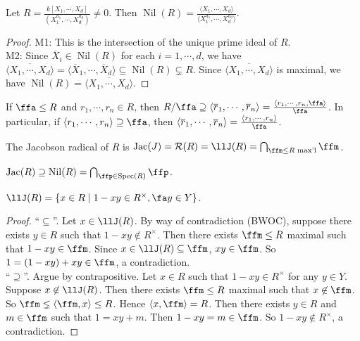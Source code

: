 \begin{example}
    Let $R = \frac{k[X_1,\cdots,X_d]}{(X_1^{a_1},\cdots,X_d^{a_d})} \neq 0$. Then $\operatorname{Nil}(R) = \frac{\langle X_1,\cdots,X_d \rangle}{\langle X_1^{a_1},\cdots,X_d^{a_d} \rangle}$.
\end{example}

\begin{proof}
    M1: This is the intersection of the unique prime ideal of $R$. \\
    M2: Since $\overline X_i \in \operatorname{Nil}(R)$ for each $i = 1,\cdots,d$, we have $\overline {\langle X_1,\cdots,X_d \rangle} = \langle \overline X_1,\cdots,\overline X_d \rangle \subseteq \operatorname{Nil}(R) \subsetneq R$. Since $\overline {\langle X_1,\cdots,X_d \rangle}$ is maximal, we have $\operatorname{Nil}(R) = \overline {\langle X_1,\cdots,X_d \rangle}$.
\end{proof}

\begin{remark}[Fact]
    If $\ffa \leq R$ and $r_1,\cdots,r_n \in R$, then $R/\ffa \supseteq \langle \overline r_1,\cdots,\overline r_n \rangle = \frac{\langle r_1,\cdots,r_n, \ffa \rangle}{\ffa}$. In particular, if $\langle r_1,\cdots,r_n \rangle \supseteq \ffa$, then $\langle \overline r_1, \cdots, \overline r_n \rangle = \frac{\langle r_1,\cdots,r_n \rangle}{\ffa}$.
\end{remark}

\begin{definition}
    The Jacobson radical of $R$ is $\operatorname{Jac}(J) = \mathcal R(R) = \llJ(R) = \bigcap_{\ffm \leq R \text{ max'l}}\ffm$.
\end{definition}

\begin{remark}
    $\operatorname{Jac}(R) \supseteq \operatorname{Nil}(R) = \bigcap_{\ffp \in \operatorname{Spec}(R)}\ffp$.
\end{remark}

\begin{proposition}
    $\llJ(R) = \{x \in R \mid 1-xy \in R^\times, \fa y \in Y\}$.
\end{proposition}

\begin{proof}
    ``$\subseteq$''. Let $x \in \llJ(R)$. By way of contradiction (BWOC), suppose there exists $y \in R$ such that $1-xy \not \in R^\times$. Then there exists $\ffm \leq R$ maximal such that $1-xy \in \ffm$. Since $x \in \llJ(R) \subseteq \ffm$, $xy \in \ffm$. So $1 = (1-xy) + xy \in \ffm$, a contradiction. \\
    ``$\supseteq$''. Argue by contrapositive. Let $x \in R$ such that $1-xy \in R^\times$ for any $y \in Y$. Suppose $x \not \in \llJ(R)$. Then there exists $\ffm \leq R$ maximal such that $x \not \in \ffm$. So $\ffm \lneq \langle \ffm, x \rangle \leq R$. Hence $\langle x,\ffm \rangle = R$. Then there exists $y \in R$ and $m \in \ffm$ such that $1 = xy+m$. Then $1-xy = m \in \ffm$. So $1-xy \not \in R^\times$, a contradiction.
\end{proof}

